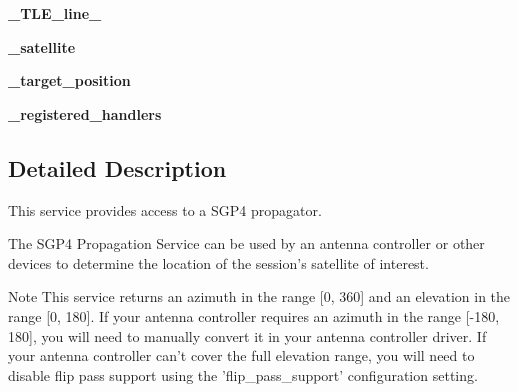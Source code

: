 \begin{DoxyCompactItemize}
\item 
\hypertarget{classhwm_1_1hardware_1_1devices_1_1drivers_1_1sgp4__tracker_1_1sgp4__tracker_1_1_s_g_p4_propagation_service_aa8c03646f4cb66af965747ec6920d63c}{{\bfseries \-\_\-\-T\-L\-E\-\_\-line\-\_}}\label{classhwm_1_1hardware_1_1devices_1_1drivers_1_1sgp4__tracker_1_1sgp4__tracker_1_1_s_g_p4_propagation_service_aa8c03646f4cb66af965747ec6920d63c}

\item 
\hypertarget{classhwm_1_1hardware_1_1devices_1_1drivers_1_1sgp4__tracker_1_1sgp4__tracker_1_1_s_g_p4_propagation_service_a040b8a13f454defc6a5aae49a907a59b}{{\bfseries \-\_\-satellite}}\label{classhwm_1_1hardware_1_1devices_1_1drivers_1_1sgp4__tracker_1_1sgp4__tracker_1_1_s_g_p4_propagation_service_a040b8a13f454defc6a5aae49a907a59b}

\item 
\hypertarget{classhwm_1_1hardware_1_1devices_1_1drivers_1_1sgp4__tracker_1_1sgp4__tracker_1_1_s_g_p4_propagation_service_af2d2726b74b56e9188b4e89aed7a0e2f}{{\bfseries \-\_\-target\-\_\-position}}\label{classhwm_1_1hardware_1_1devices_1_1drivers_1_1sgp4__tracker_1_1sgp4__tracker_1_1_s_g_p4_propagation_service_af2d2726b74b56e9188b4e89aed7a0e2f}

\item 
\hypertarget{classhwm_1_1hardware_1_1devices_1_1drivers_1_1sgp4__tracker_1_1sgp4__tracker_1_1_s_g_p4_propagation_service_a870418c6e24354d557ac6ea99e5d48a0}{{\bfseries \-\_\-registered\-\_\-handlers}}\label{classhwm_1_1hardware_1_1devices_1_1drivers_1_1sgp4__tracker_1_1sgp4__tracker_1_1_s_g_p4_propagation_service_a870418c6e24354d557ac6ea99e5d48a0}

\end{DoxyCompactItemize}


\subsection{Detailed Description}
This service provides access to a S\-G\-P4 propagator. 

The S\-G\-P4 Propagation Service can be used by an antenna controller or other devices to determine the location of the session's satellite of interest.

\begin{DoxyNote}{Note}
This service returns an azimuth in the range \mbox{[}0, 360\mbox{]} and an elevation in the range \mbox{[}0, 180\mbox{]}. If your antenna controller requires an azimuth in the range \mbox{[}-\/180, 180\mbox{]}, you will need to manually convert it in your antenna controller driver. If your antenna controller can't cover the full elevation range, you will need to disable flip pass support using the 'flip\-\_\-pass\-\_\-support' configuration setting. 
\end{DoxyNote}


